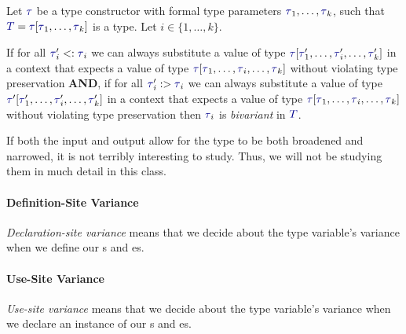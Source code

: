 \begin{definition}[Bivariance]\label{def:Type_Bivariance}
  Let $\DataType$ be a type constructor with formal type parameters $\DataType_{1}, \ldots , \DataType_{k}$, such that $\SemanticType{T} = \DataType [\DataType_{1}, \ldots, \DataType_{k}]$ is a type.
  Let $i \in \lbrace 1,\ldots, k \rbrace$.

  If for all $\DataType_{i}' <: \DataType_{i}$ we can always substitute a value of type $\DataType [\DataType_{1}',\ldots, \DataType_{i}', \ldots, \DataType_{k}']$ in a context that expects a value of type $\DataType [\DataType_{1}, \ldots, \DataType_{i}, \ldots, \DataType_{k}]$ without violating type preservation \textbf{AND}, if for all $\DataType_{i}' :> \DataType_{i}$ we can always substitute a value of type $\DataType' [\DataType_{1}', \ldots, \DataType_{i}', \ldots, \DataType_{k}']$ in a context that expects a value of type $\DataType [\DataType_{1}, \ldots, \DataType_{i}, \ldots, \DataType_{k}]$ without violating type preservation then $\DataType_{i}$ is \emph{bivariant} in $\SemanticType{T}$.

  \begin{remark}
    If both the input and output allow for the type to be both broadened and narrowed, it is not terribly interesting to study.
    Thus, we will not be studying them in much detail in this class.
  \end{remark}
\end{definition}

\paragraph{Definition-Site Variance}\label{par:Definition_Site_Variance}
\begin{definition}\label{def:Definition_Site_Variance}
  \emph{Declaration-site variance} means that we decide about the type variable's variance when we define our s and es.
\end{definition}

\paragraph{Use-Site Variance}\label{par:Use_Site_Variance}
\begin{definition}\label{def:Use_Site_Variance}
  \emph{Use-site variance} means that we decide about the type variable's variance when we declare an instance of our s and es.
\end{definition}

